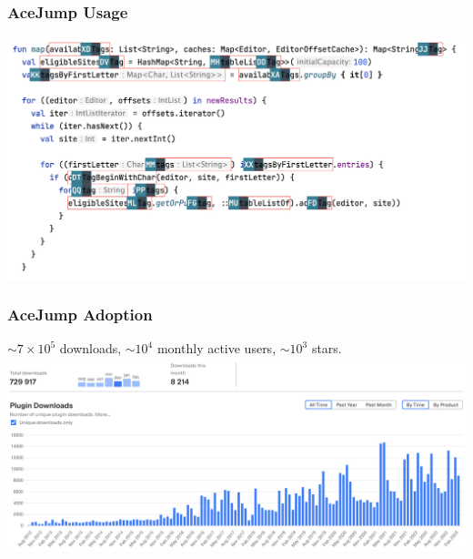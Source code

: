 \documentclass[mathserif,notheorems]{beamer}
\theoremstyle{plain} %
\theoremstyle{definition} %
\begin{document}
\begin{frame}
  \frametitle{AceJump Usage}
  \includegraphics[scale=0.25]{acejump_screenshot}
\end{frame}

\begin{frame}
  \frametitle{AceJump Adoption}
  $\sim 7\times 10^5$ downloads, $\sim 10^4$ monthly active users, $\sim 10^3$ stars.\vspace{20pt}
  \includegraphics[scale=0.22]{acejump_adoption}
\end{frame}
\end{document}
